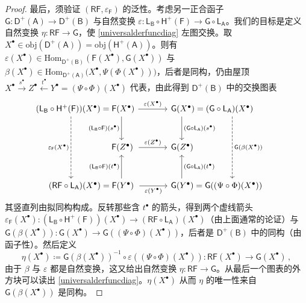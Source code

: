 \begin{proof}
	最后，须验证 $(\mathsf{RF},\varepsilon_\mathsf{F})$ 的泛性。考虑另一正合函子 $\mathsf{G}:\mathsf{D^+(A)}\rightarrow\mathsf{D^+(B)}$ 与自然变换 $\varepsilon:\mathsf{L_B\circ H^+(F)}\rightarrow \mathsf{G\circ L_A}$。我们的目标是定义自然变换 $\eta:\mathsf{RF}\rightarrow\mathsf{G}$，使 \eqref{universalderfuncdiag} 左图交换。取 $X^\bullet\in\text{obj}(\mathsf{D^+(A)})=\text{obj}(\mathsf{H^+(A)})$。则有 $\varepsilon(X^\bullet)\in\text{Hom}_\mathsf{D^+(B)}(\mathsf{F}(X^\bullet),\mathsf{G}(X^\bullet))$ 与 $\beta(X^\bullet)\in\text{Hom}_\mathsf{D^+(A)}\big(X^\bullet,\Psi(\Phi(X^\bullet))\big)$，后者是同构，仍由屋顶 $X^\bullet\xrightarrow{s^\bullet} Z^\bullet\xleftarrow{t^\bullet} Y^\bullet=(\Psi\circ\Phi)(X^\bullet)$ 代表，由此得到 $\mathsf{D^+(B)}$ 中的交换图表
	\[
	\begin{tikzcd}[row sep=1cm]
		\mkern-69mu(\mathsf{L_B}\circ\mathsf{H^+(F)})(X^\bullet)=\mathsf{F}(X^\bullet)\arrow[r, "\varepsilon(X^\bullet)"]\arrow[d, shift right=-24mu, "(\mathsf{L_B}\circ\mathsf{F})(s^\bullet)"']\arrow[dd, dashed, shift right=36mu, "\varepsilon_\mathsf{F}(X^\bullet)"']  & \mathsf{G}(X^\bullet)=(\mathsf{G}\circ\mathsf{L_A})(X^\bullet)\arrow[d, shift right=36mu, "(\mathsf{G}\circ\mathsf{L_A})(s^\bullet)"]\arrow[dd, dashed, shift left=24mu, "\mathsf{G}(\beta(X^\bullet))"] \\
		\mkern+90mu\mathsf{F}(Z^\bullet)\arrow[r, shorten=6.4ex, xshift=-5.9ex, "\varepsilon(Z^\bullet)"] & \mkern-128mu\mathsf{G}(Z^\bullet) \\
		\mkern-43mu(\mathsf{RF}\circ\mathsf{L_A})(X^\bullet)=\mathsf{F}(Y^\bullet)\arrow[r, shorten=-1ex, xshift=1.5ex, "\varepsilon(Y^\bullet)"']\arrow[u, shift right=24mu, "(\mathsf{L_B}\circ\mathsf{F})(t^\bullet)"] & \mkern+19mu\mathsf{G}(Y^\bullet)=\mathsf{G}((\Psi\circ\Phi)(X^\bullet))\arrow[u, shift right=-36mu, "(\mathsf{G}\circ\mathsf{L_A})(t^\bullet)"']
	\end{tikzcd}
	\]
	其竖直列由拟同构构成。反转那些含 $t^\bullet$ 的箭头，得到两个虚线箭头 $\varepsilon_\mathsf{F}(X^\bullet):(\mathsf{L_B\circ H^+(F)})(X^\bullet)\rightarrow(\mathsf{RF\circ L_A})(X^\bullet)$（由上面通常的论证）与 $\mathsf{G}(\beta(X^\bullet)):\mathsf{G}(X^\bullet)\rightarrow\mathsf{G}((\Psi\circ\Phi)(X^\bullet))$，后者是 $\mathsf{D^+(B)}$ 中的同构（由函子性）。然后定义
	\[
	\eta(X^\bullet)\coloneqq\mathsf{G}(\beta(X^\bullet))^{-1}\circ\varepsilon((\Psi\circ\Phi)(X^\bullet)):\mathsf{RF}(X^\bullet)\rightarrow\mathsf{G}(X^\bullet)\,,
	\]
	由于 $\beta$ 与 $\varepsilon$ 都是自然变换，这又给出自然变换 $\eta:\mathsf{RF}\rightarrow\mathsf{G}$。从最后一个图表的外方块可以读出 \eqref{universalderfuncdiag}。$\eta(X^\bullet)$ 从而 $\eta$ 的唯一性来自 $\mathsf{G}(\beta(X^\bullet))$ 是同构。
\end{proof}


